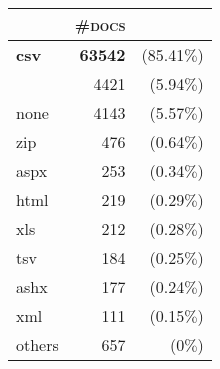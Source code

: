 \begin{tabular}{lrr} 
 \toprule 
 & \textsc{\#docs} & \\ 
 \midrule 
\textbf{csv}&\textbf{63542 }&(85.41$\%$)\\ 
  &4421 &(5.94$\%$)\\ 
  none&4143 &(5.57$\%$)\\ 
  zip&476 &(0.64$\%$)\\ 
  aspx&253 &(0.34$\%$)\\ 
  html&219 &(0.29$\%$)\\ 
  xls&212 &(0.28$\%$)\\ 
  tsv&184 &(0.25$\%$)\\ 
  ashx&177 &(0.24$\%$)\\ 
  xml&111 &(0.15$\%$)\\ 
  \bottomrule 
others&657 &(0$\%$)\\ 
  \bottomrule 
 \end{tabular}